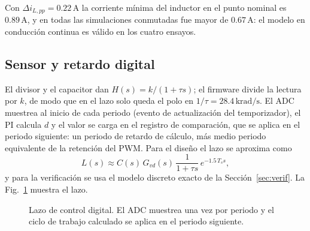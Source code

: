 \documentclass[conference,letterpaper]{IEEEtran}
\newcommand{\unit}[1]{\,\mathrm{#1}}
\begin{document}
Con $\Delta i_{L,pp}=0.22\unit{A}$ la corriente mínima del inductor en el punto nominal es $0.89\unit{A}$, y en todas las simulaciones conmutadas fue mayor de $0.67\unit{A}$: el modelo en conducción continua es válido en los cuatro ensayos.

\subsection{Sensor y retardo digital}
El divisor y el capacitor dan $H(s)=k/(1+\tau s)$; el firmware divide la lectura por $k$, de modo que en el lazo solo queda el polo en $1/\tau=28.4\unit{krad/s}$. El ADC muestrea al inicio de cada periodo (evento de actualización del temporizador), el PI calcula $d$ y el valor se carga en el registro de comparación, que se aplica en el periodo siguiente: un periodo de retardo de cálculo, más medio periodo equivalente de la retención del PWM. Para el diseño el lazo se aproxima como
\begin{equation}
L(s)\approx C(s)\,G_{vd}(s)\,\frac{1}{1+\tau s}\,e^{-1.5\,T_s s},\label{eq:lazo}
\end{equation}
y para la verificación se usa el modelo discreto exacto de la Sección~\ref{sec:verif}. La Fig.~\ref{fig:lazo} muestra el lazo.

\begin{figure}[H]\centering{}\caption{Lazo de control digital. El ADC muestrea una vez por periodo y el ciclo de trabajo calculado se aplica en el periodo siguiente.}\label{fig:lazo}\end{figure}
\end{document}
